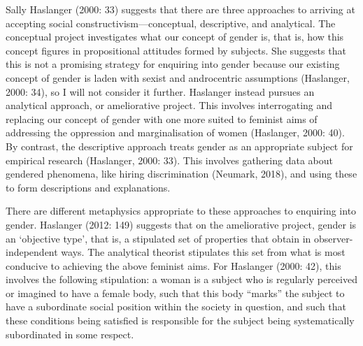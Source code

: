 Sally Haslanger (2000: 33) suggests that there are three approaches to
arriving at accepting social constructivism---conceptual, descriptive,
and analytical. The conceptual project investigates what our concept of
gender is, that is, how this concept figures in propositional attitudes
formed by subjects. She suggests that this is not a promising strategy
for enquiring into gender because our existing concept of gender is
laden with sexist and androcentric assumptions (Haslanger, 2000: 34), so
I will not consider it further. Haslanger instead pursues an analytical
approach, or ameliorative project. This involves interrogating and
replacing our concept of gender with one more suited to feminist aims of
addressing the oppression and marginalisation of women (Haslanger, 2000:
40). By contrast, the descriptive approach treats gender as an
appropriate subject for empirical research (Haslanger, 2000: 33). This
involves gathering data about gendered phenomena, like hiring
discrimination (Neumark, 2018), and using these to form descriptions and
explanations.

There are different metaphysics appropriate to these approaches to
enquiring into gender. Haslanger (2012: 149) suggests that on the
ameliorative project, gender is an `objective type', that is, a
stipulated set of properties that obtain in observer-independent ways.
The analytical theorist stipulates this set from what is most conducive
to achieving the above feminist aims. For Haslanger (2000: 42), this
involves the following stipulation: a woman is a subject who is
regularly perceived or imagined to have a female body, such that this
body ``marks'' the subject to have a subordinate social position within
the society in question, and such that these conditions being satisfied
is responsible for the subject being systematically subordinated in some
respect.

